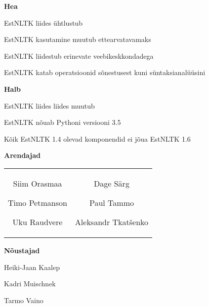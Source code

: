 \documentclass[landscape,footrule]{foils}
\begin{document}

\textbf{Hea}
\begin{triangles}
\item EstNLTK liides ühtlustub 
\item EstNLTK kasutamine muutub ettearvatavamaks
\item EstNLTK liidestub erinevate veebikeskkondadega
\item EstNLTK katab operatsioonid sõnestusest kuni süntaksianalüüsini
\end{triangles}
\vspace*{2cm}
\textbf{Halb}
\begin{triangles}
\item EstNLTK liides liides muutub
\item EstNLTK nõuab Pythoni versiooni 3.5
\item Kõik EstNLTK 1.4 olevad komponendid ei jõua EstNLTK 1.6
\end{triangles}




\textbf{Arendajad}
\begin{center}
\begin{tabular}{cc}
\begin{minipage}[t]{7cm}
\begin{bullets}
\item Siim Orasmaa
\item Timo Petmanson
\item Uku Raudvere
\end{bullets}
\end{minipage}
&
\begin{minipage}[t]{10cm}
\begin{bullets}
\item Dage Särg
\item Paul Tammo
\item Aleksandr Tkatšenko
\end{bullets}  
\end{minipage}
\end{tabular}
\end{center}
\vspace*{2cm}
\textbf{Nõustajad}
\begin{center}
\begin{minipage}[t]{10cm}
\begin{bullets}
\item Heiki-Jaan Kaalep
\item Kadri Muischnek
\item Tarmo Vaino
\end{bullets}  
\end{minipage}
\hspace*{7.5cm}
\end{center}
\end{document}
